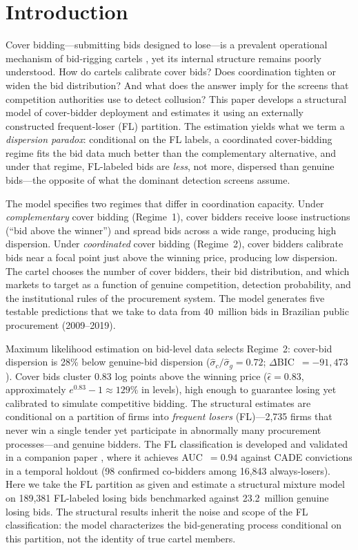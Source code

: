 \section{Introduction}
\label{sec:intro}

Cover bidding---submitting bids designed to lose---is a prevalent
operational mechanism of bid-rigging cartels
\citep{oecd2012fighting}, yet its internal
structure remains poorly understood. How do cartels calibrate cover
bids? Does coordination tighten or widen the bid distribution? And
what does the answer imply for the screens that competition authorities
use to detect collusion? This paper develops a structural model of cover-bidder deployment
and estimates it using an externally constructed frequent-loser (FL)
partition. The estimation yields what we term a \emph{dispersion paradox}:
conditional on the FL labels, a coordinated cover-bidding regime
fits the bid data much better than the complementary alternative,
and under that regime, FL-labeled bids are \emph{less}, not more,
dispersed than genuine bids---the opposite of what the dominant
detection screens assume.

The model specifies two regimes that differ in coordination capacity.
Under \emph{complementary} cover bidding (Regime~1), cover bidders
receive loose instructions (``bid above the winner'') and spread bids
across a wide range, producing high dispersion. Under
\emph{coordinated} cover bidding (Regime~2), cover bidders calibrate
bids near a focal point just above the winning price, producing low
dispersion. The cartel chooses the number of cover bidders, their bid
distribution, and which markets to target as a function of genuine
competition, detection probability, and the institutional rules of the
procurement system. The model generates five testable predictions that
we take to data from 40~million bids in Brazilian public procurement
(2009--2019).

Maximum likelihood estimation on bid-level data selects Regime~2:
cover-bid dispersion is 28\% below genuine-bid dispersion
($\hat{\sigma}_c / \hat{\sigma}_g = 0.72$;
$\Delta$BIC~$= -91{,}473$). Cover bids cluster 0.83 log points above the winning price
($\hat{\epsilon} = 0.83$, approximately $e^{0.83} - 1 \approx 129\%$
in levels), high enough to guarantee losing yet calibrated to
simulate competitive bidding. The
structural estimates are conditional on a partition of firms into
\emph{frequent losers} (FL)---2,735 firms that never win a single
tender yet participate in abnormally many procurement
processes---and genuine bidders. The FL classification is developed
and validated in a companion paper
\citep{genicolomartins2026screening}, where it achieves
AUC~$= 0.94$ against CADE convictions in a temporal holdout (98
confirmed co-bidders among 16,843 always-losers). Here we take the
FL partition as given and estimate a structural mixture model on
189,381 FL-labeled losing bids benchmarked against 23.2~million
genuine losing bids. The structural results inherit the noise and
scope of the FL classification: the model characterizes the
bid-generating process conditional on this partition, not the
identity of true cartel members.

